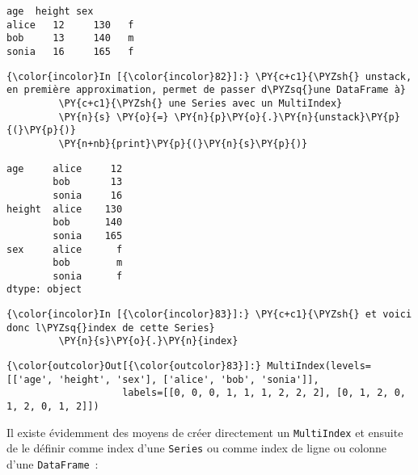     \begin{Verbatim}[commandchars=\\\{\},frame=single,framerule=0.3mm,rulecolor=\color{cellframecolor}]
       age  height sex
alice   12     130   f
bob     13     140   m
sonia   16     165   f
\end{Verbatim}

    \begin{Verbatim}[commandchars=\\\{\},frame=single,framerule=0.3mm,rulecolor=\color{cellframecolor}]
{\color{incolor}In [{\color{incolor}82}]:} \PY{c+c1}{\PYZsh{} unstack, en première approximation, permet de passer d\PYZsq{}une DataFrame à}
         \PY{c+c1}{\PYZsh{} une Series avec un MultiIndex}
         \PY{n}{s} \PY{o}{=} \PY{n}{p}\PY{o}{.}\PY{n}{unstack}\PY{p}{(}\PY{p}{)}
         \PY{n+nb}{print}\PY{p}{(}\PY{n}{s}\PY{p}{)}
\end{Verbatim}


    \begin{Verbatim}[commandchars=\\\{\},frame=single,framerule=0.3mm,rulecolor=\color{cellframecolor}]
age     alice     12
        bob       13
        sonia     16
height  alice    130
        bob      140
        sonia    165
sex     alice      f
        bob        m
        sonia      f
dtype: object
\end{Verbatim}

    \begin{Verbatim}[commandchars=\\\{\},frame=single,framerule=0.3mm,rulecolor=\color{cellframecolor}]
{\color{incolor}In [{\color{incolor}83}]:} \PY{c+c1}{\PYZsh{} et voici donc l\PYZsq{}index de cette Series}
         \PY{n}{s}\PY{o}{.}\PY{n}{index}
\end{Verbatim}


\begin{Verbatim}[commandchars=\\\{\},frame=single,framerule=0.3mm,rulecolor=\color{cellframecolor}]
{\color{outcolor}Out[{\color{outcolor}83}]:} MultiIndex(levels=[['age', 'height', 'sex'], ['alice', 'bob', 'sonia']],
                    labels=[[0, 0, 0, 1, 1, 1, 2, 2, 2], [0, 1, 2, 0, 1, 2, 0, 1, 2]])
\end{Verbatim}
            
    Il existe évidemment des moyens de créer directement un
\texttt{MultiIndex} et ensuite de le définir comme index d'une
\texttt{Series} ou comme index de ligne ou colonne d'une
\texttt{DataFrame}~:


